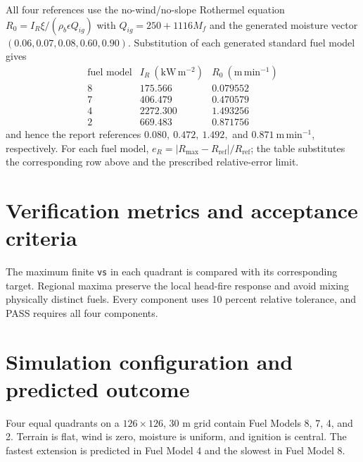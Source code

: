 All four references use the no-wind/no-slope Rothermel equation
\(R_0=I_R\xi/(\rho_b\epsilon Q_{ig})\) with
\(Q_{ig}=250+1116M_f\) and the generated moisture vector
\((0.06,0.07,0.08,0.60,0.90)\).  Substitution of each generated standard
fuel model gives
\[
\begin{array}{c|cc}
\text{fuel model}&I_R~(\mathrm{kW\,m^{-2}})&R_0~(\mathrm{m\,min^{-1}})\\
\hline
8&175.566&0.079552\\
7&406.479&0.470579\\
4&2272.300&1.493256\\
2&669.483&0.871756
\end{array}
\]
and hence the report references \(0.080,\ 0.472,\ 1.492,\) and
\(0.871~\mathrm{m\,min^{-1}}\), respectively.  For each fuel model,
\(e_R=|R_{\max}-R_{\mathrm{ref}}|/R_{\mathrm{ref}}\); the table substitutes
the corresponding row above and the prescribed relative-error limit.

\section{Verification metrics and acceptance criteria}

The maximum finite \texttt{vs} in each quadrant is compared with its corresponding target.  Regional maxima preserve the local head-fire response and avoid mixing physically distinct fuels.  Every component uses 10 percent relative tolerance, and PASS requires all four components.

\section{Simulation configuration and predicted outcome}

Four equal quadrants on a \(126\times126\), 30 m grid contain Fuel Models 8, 7, 4, and 2. Terrain is flat, wind is zero, moisture is uniform, and ignition is central. The fastest extension is predicted in Fuel Model 4 and the slowest in Fuel Model 8.

